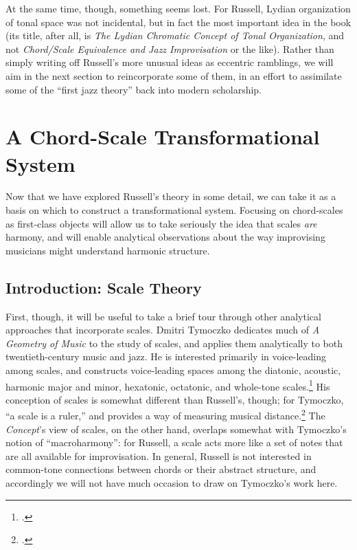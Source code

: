 At the same time, though, something seems lost. For Russell, Lydian
organization of tonal space was not incidental, but in fact the most important
idea in the book (its title, after all, is \emph{The Lydian Chromatic Concept
  of Tonal Organization}, and not \emph{Chord/Scale Equivalence and Jazz
  Improvisation} or the like). Rather than simply writing off Russell's more
unusual ideas as eccentric ramblings, we will aim in the next section to
reincorporate some of them, in an effort to assimilate some of the ``first
jazz theory'' back into modern scholarship.

\section{A Chord-Scale Transformational System}
\label{sec:cst}

Now that we have explored Russell's theory in some detail, we can take it as a
basis on which to construct a transformational system. Focusing on
chord-scales as first-class objects will allow us to take seriously the idea
that scales \emph{are} harmony, and will enable analytical observations about
the way improvising musicians might understand harmonic structure.

\subsection{Introduction: Scale Theory}
\label{subsec:scale-theory}

First, though, it will be useful to take a brief tour through other analytical
approaches that incorporate scales. Dmitri Tymoczko dedicates much of \emph{A
Geometry of Music} to the study of scales, and applies them analytically to
both twentieth-century music and jazz. He is interested primarily in
voice-leading among scales, and constructs voice-leading spaces among the
diatonic, acoustic, harmonic major and minor, hexatonic, octatonic, and
whole-tone scales.\footcite[135]{tymoczko:2011} His conception of scales
is somewhat different than Russell's, though; for Tymoczko, ``a scale is a
ruler,'' and provides a way of measuring musical
distance.\footcite[116]{tymoczko:2011} The \emph{Concept}'s view of scales, on
the other hand, overlaps somewhat with
Tymoczko's notion of ``macroharmony'': for Russell, a scale acts more like a
set of notes that are all available for improvisation. In general, Russell is
not interested in common-tone connections between chords or their abstract
structure, and accordingly we will not have much occasion to draw on
Tymoczko's work here.

